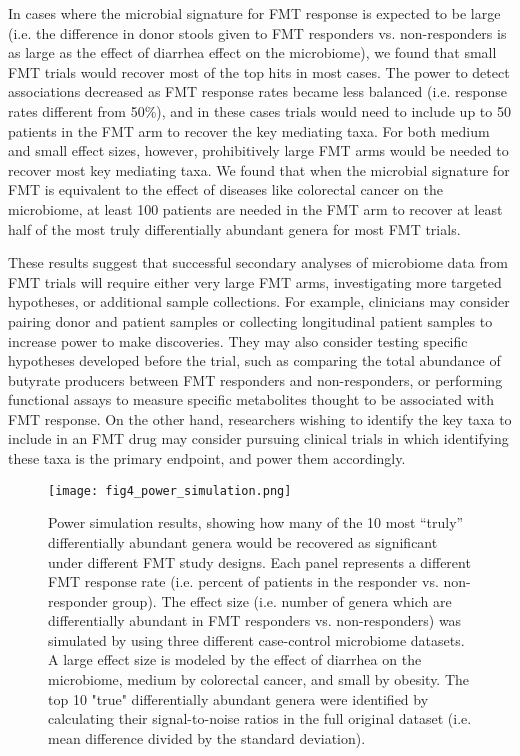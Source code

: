 In cases where the microbial signature for FMT response is expected to be large (i.e. the difference in donor stools given to FMT responders vs. non-responders is as large as the effect of diarrhea effect on the microbiome), we found that small FMT trials would recover most of the top hits in most cases.
The power to detect associations decreased as FMT response rates became less balanced (i.e. response rates different from 50\%), and in these cases trials would need to include up to 50 patients in the FMT arm to recover the key mediating taxa.
For both medium and small effect sizes, however, prohibitively large FMT arms would be needed to recover most key mediating taxa.
We found that when the microbial signature for FMT is equivalent to the effect of diseases like colorectal cancer on the microbiome, at least 100 patients are needed in the FMT arm to recover at least half of the most truly differentially abundant genera for most FMT trials.

These results suggest that successful secondary analyses of microbiome data from FMT trials will require either very large FMT arms, investigating more targeted hypotheses, or additional sample collections.
For example, clinicians may consider pairing donor and patient samples or collecting longitudinal patient samples to increase power to make discoveries.
They may also consider testing specific hypotheses developed before the trial, such as comparing the total abundance of butyrate producers between FMT responders and non-responders, or performing functional assays to measure specific metabolites thought to be associated with FMT response.
On the other hand, researchers wishing to identify the key taxa to include in an FMT drug may consider pursuing clinical trials in which identifying these taxa is the primary endpoint, and power them accordingly.


\begin{figure}
    \begin{center}
    \texttt{[image: fig4\_power\_simulation.png]}
    \caption{Power simulation results, showing how many of the 10 most ``truly'' differentially abundant genera would be recovered as significant under different FMT study designs. Each panel represents a different FMT response rate (i.e. percent of patients in the responder vs. non-responder group). The effect size (i.e. number of genera which are differentially abundant in FMT responders vs. non-responders) was simulated by using three different case-control microbiome datasets. A large effect size is modeled by the effect of diarrhea on the microbiome, medium by colorectal cancer, and small by obesity. The top 10 "true" differentially abundant genera were identified by calculating their signal-to-noise ratios in the full original dataset (i.e. mean difference divided by the standard deviation).}\label{fig:power-sim}
    \end{center}
\end{figure}

